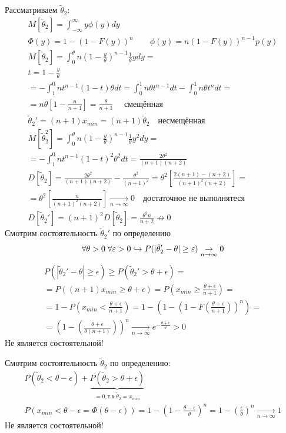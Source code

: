 \documentclass{article}
\begin{document}
\begin{problem}[Т1]
  Рассматриваем $\tilde{\theta}_2$:
  \begin{gather*}
    M[\tilde\theta_2]=\int_{-\infty}^{\infty}y\phi(y)dy \\ 
    \Phi(y)=1-(1-F(y))^{n} \qquad \phi(y)=n(1-F(y))^{n-1}p(y) \\
    M[\tilde\theta_2]=\int_{0}^{\theta}n(1-\frac{y}{\theta})^{n-1}\frac{1}{\theta}ydy =\\
    t = 1 - \frac{y}{\theta} \\ 
    = -\int_{1}^{0}nt^{n-1}(1-t)\theta dt=\int_{0}^{1}n\theta t^{n-1}dt - \int_{0}^{1}n\theta t^{n}dt= \\
    =n\theta[1-\frac{n}{n+1}]=\frac{\theta}{n+1}\quad \text{  смещённая} \\
    \tilde\theta_2'=(n+1)x_{min}=(n+1)\tilde\theta_2 \quad \text{несмещённая} \\
    M[\tilde\theta_2^{2}]=\int_{0}^{\theta}n(1-\frac{y}{\theta})^{n-1}\frac{1}{\theta}y^{2}dy =\\
    = -\int_{1}^{0}nt^{n-1}(1-t)^{2}\theta^{2} dt= \frac{2\theta^{2}}{(n+1)(n+2)} \\ 
    D[\tilde\theta_2]=\frac{2\theta^{2}}{(n+1)(n+2)}-\frac{\theta^{2}}{(n+1)^{2}}=
    \theta^{2}\left[\frac{2(n+1)-(n+2)}{(n+1)^{2}(n+2)}\right]= \\ 
    =\theta^{2}\left[\frac{n}{(n+1)^{2}(n+2)}\right] \underset{n\to\infty}{\to}0
    \quad \text{достаточное не выполнятеся} \\ 
    D[\tilde\theta_2']=(n+1)^{2}D[\tilde\theta_2]=\frac{\theta^{2}n}{n+2}\not\to 0
  \end{gather*}
  Смотрим состоятельность $\tilde\theta_2'$ по определению
  \[
    \forall \theta >0 \; \forall \varepsilon>0 \hookrightarrow P(|\tilde\theta_2'-\theta|\ge\varepsilon) \underset{n\to\infty}{\to} 0 
  \]
  \begin{gather*}
    P(|\tilde\theta_2'-\theta|\ge\epsilon) \ge  P(\tilde\theta_2' > \theta +\epsilon)= \\ 
    = P((n+1)x_{min}\ge \theta + \epsilon)=P(x_{min} \ge \frac{\theta+\epsilon}{n+1}) = \\ 
    = 1-P(x_{min}<\frac{\theta+\epsilon}{n+1})=1-(1-(1-F(\frac{\theta+\epsilon}{n+1}))^{n})= \\ 
    =(1-(\frac{\theta+\epsilon}{\theta(n+1)}))^{n}\underset{n\to\infty}{\to}e^{-\frac{\theta+\epsilon}{\theta}} >0
  \end{gather*}
  Не является состоятельной!

  Смотрим состоятельность $\tilde\theta_2$ по определению:
  \begin{gather*}
    P(\tilde\theta_2<\theta-\epsilon) + \underbrace{P(\tilde\theta_2>\theta+\epsilon)}_{=0, \text{т.к.} \tilde\theta_2=x_{min}} \\ 
    P(x_{min}<\theta-\epsilon=\Phi(\theta-\epsilon))=1-(1-\frac{\theta-\epsilon}{\theta})^{n}=
    1-\left(\frac{\epsilon}{\theta}\right)^{n} \underset{n\to\infty}{\to}1
  \end{gather*}
  Не является состоятельной!


\end{problem}
\end{document}
